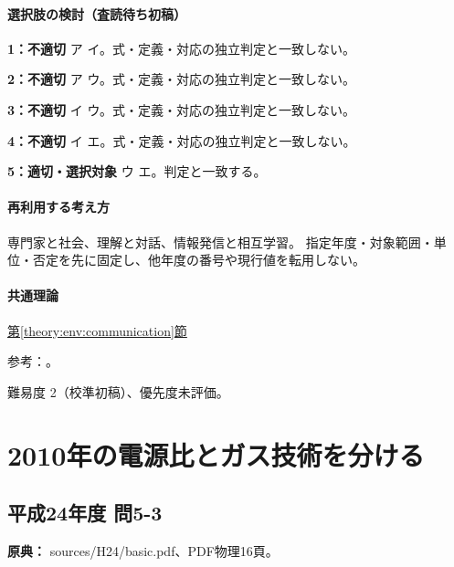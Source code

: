 \paragraph{選択肢の検討（査読待ち初稿）}\mbox{}\par

\noindent\textbf{1：不適切} ア イ。式・定義・対応の独立判定と一致しない。\par

\noindent\textbf{2：不適切} ア ウ。式・定義・対応の独立判定と一致しない。\par

\noindent\textbf{3：不適切} イ ウ。式・定義・対応の独立判定と一致しない。\par

\noindent\textbf{4：不適切} イ エ。式・定義・対応の独立判定と一致しない。\par

\noindent\textbf{5：適切・選択対象} ウ エ。判定と一致する。\par

\paragraph{再利用する考え方} 専門家と社会、理解と対話、情報発信と相互学習。 指定年度・対象範囲・単位・否定を先に固定し、他年度の番号や現行値を転用しない。

\paragraph{共通理論} \hyperref[theory:env:communication]{第\ref*{theory:env:communication}節}

\par 参考：\cite{env58_communication}。

\par 難易度 2（校準初稿）、優先度未評価。

\section{2010年の電源比とガス技術を分ける}

\subsection{平成24年度 問5-3}
\label{q:h24-reg-basic-5-3}

\noindent\textbf{原典：} sources/H24/basic.pdf、PDF物理16頁。

